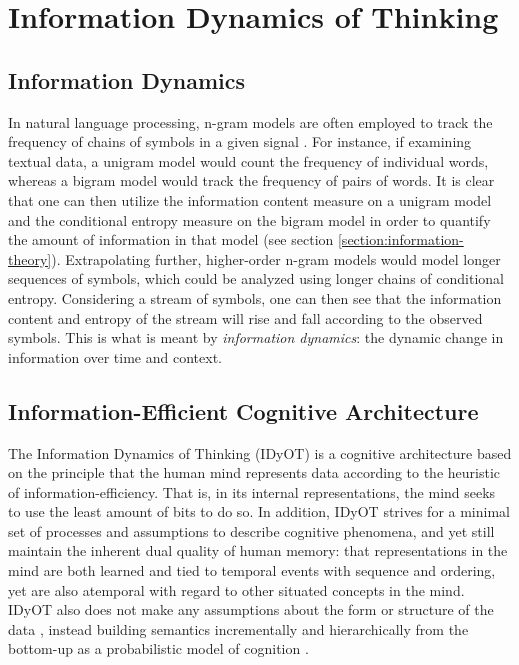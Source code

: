 \section{Information Dynamics of Thinking}
\label{section:idyot}

\subsection{Information Dynamics}
\label{section:information-dynamics}

In natural language processing, n-gram models are often employed to track the frequency of chains of symbols in a given signal \citep{sproat1996stochastic}.  For instance, if examining textual data, a unigram model would count the frequency of individual words, whereas a bigram model would track the frequency of pairs of words.  It is clear that one can then utilize the information content measure on a unigram model and the conditional entropy measure on the bigram model in order to quantify the amount of information in that model (see section \ref{section:information-theory}). Extrapolating further, higher-order n-gram models would model longer sequences of symbols, which could be analyzed using longer chains of conditional entropy.  Considering a stream of symbols, one can then see that the information content and entropy of the stream will rise and fall according to the observed symbols.  This is what is meant by \textit{information dynamics}: the dynamic change in information over time and context.

\subsection{Information-Efficient Cognitive Architecture}
\label{section:information-efficient-cognitive-architecture}

The Information Dynamics of Thinking \citep{wiggins2018creativity} (IDyOT) is a cognitive architecture based on the principle that the human mind represents data according to the heuristic of information-efficiency.  That is, in its internal representations, the mind seeks to use the least amount of bits to do so.  In addition, IDyOT strives for a minimal set of processes and assumptions to describe cognitive phenomena, and yet still maintain the inherent dual quality of human memory: that representations in the mind are both learned and tied to temporal events with sequence and ordering, yet are also atemporal with regard to other situated concepts in the mind.  IDyOT also does not make any assumptions about the form or structure of the data \citep{kemp2008discovery}, instead building semantics incrementally and hierarchically from the bottom-up as a probabilistic model of cognition \citep{chater2006probabilistic}.

